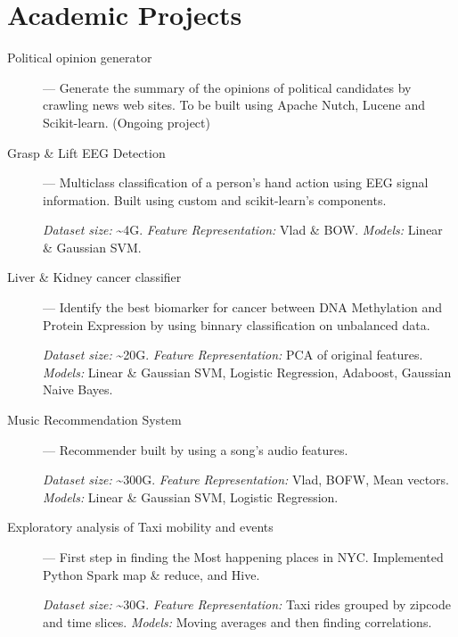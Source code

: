 \documentclass{resume}
\begin{document}
\section{Academic Projects}
  \begin{description}
    \item[Political opinion generator] --- Generate the summary of the opinions of political candidates by crawling news web sites. To be built using Apache Nutch, Lucene and Scikit-learn. (Ongoing project)
    \item[Grasp \& Lift EEG Detection] --- Multiclass classification of a person's hand action using EEG signal information.  Built using custom and scikit-learn's components.
      \par \textit{Dataset size:} \textasciitilde{}4G.  \textit{Feature Representation:} Vlad \& BOW\@.  \textit{Models:} Linear \& Gaussian SVM\@.
    \item[Liver \& Kidney cancer classifier] --- Identify the best biomarker for cancer between DNA Methylation and Protein Expression by using binnary classification on unbalanced data.
      \par \textit{Dataset size:} \textasciitilde{}20G.  \textit{Feature Representation:} PCA of original features.  \textit{Models:} Linear \& Gaussian SVM\@, Logistic Regression, Adaboost, Gaussian Naive Bayes.
    \item[Music Recommendation System] --- Recommender built by using a song's audio features.
      \par \textit{Dataset size:} \textasciitilde{}300G.  \textit{Feature Representation:} Vlad, BOFW, Mean vectors.  \textit{Models:} Linear \& Gaussian SVM, Logistic Regression.
    \item[Exploratory analysis of Taxi mobility and events] --- First step in finding the Most happening places in NYC\@.  Implemented Python Spark map \& reduce, and Hive.
      \par \textit{Dataset size:} \textasciitilde{}30G. \textit{Feature Representation:} Taxi rides grouped by zipcode and time slices.  \textit{Models:} Moving averages and then finding correlations.
  \end{description}

\end{document}
